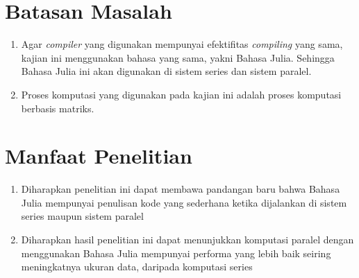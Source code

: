 \section{Batasan Masalah}
\begin{enumerate}
  \item Agar \emph{compiler} yang digunakan mempunyai efektifitas \emph{compiling} yang
        sama, kajian ini menggunakan bahasa yang sama, yakni Bahasa Julia. Sehingga
        Bahasa Julia ini akan digunakan di sistem series dan sistem paralel.

  \item Proses komputasi yang digunakan pada kajian ini adalah proses komputasi
        berbasis matriks.
\end{enumerate}

\section{Manfaat Penelitian}
\begin{enumerate}
  \item Diharapkan penelitian ini dapat membawa pandangan baru bahwa Bahasa Julia
        mempunyai penulisan kode yang sederhana ketika dijalankan di sistem series
        maupun sistem paralel

  \item Diharapkan hasil penelitian ini dapat menunjukkan komputasi paralel dengan
        menggunakan Bahasa Julia mempunyai performa yang lebih baik seiring
        meningkatnya ukuran data, daripada komputasi series
\end{enumerate}